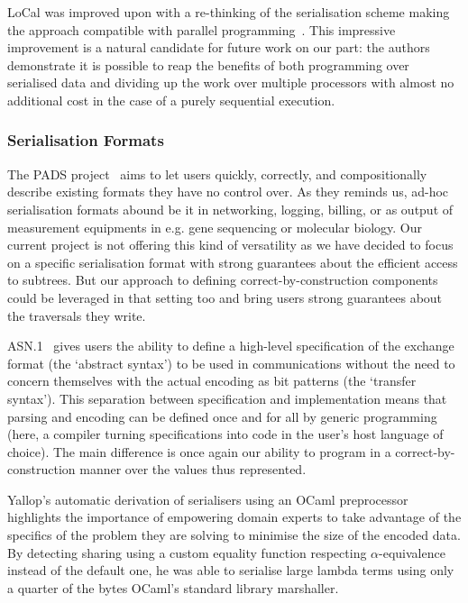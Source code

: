 LoCal was improved upon with a re-thinking of the serialisation scheme
making the approach compatible with parallel
programming~\citep{DBLP:journals/pacmpl/KoparkarRVKN21}.
This impressive improvement is a natural candidate for future work on our
part: the authors demonstrate it is possible to reap the benefits of
both programming over serialised data
and dividing up the work over multiple processors
with almost no additional cost in the case of a purely sequential execution.

\subsubsection{Serialisation Formats}

The PADS project~\citep{DBLP:conf/popl/MandelbaumFWFG07} aims to let users
quickly, correctly, and compositionally describe existing formats they
have no control over.
%
As they reminds us, ad-hoc serialisation formats abound be it in
networking, logging, billing, or as output of measurement equipments
in e.g. gene sequencing or molecular biology.
%
Our current project is not offering this kind of versatility as we have
decided to focus on a specific serialisation format with strong
guarantees about the efficient access to subtrees.
%
But our approach to defining correct-by-construction components could
be leveraged in that setting too and bring users strong guarantees about
the traversals they write.

ASN.1~\citep{MANUAL:book/larmouth1999} gives users the ability to define
a high-level specification of the exchange format (the `abstract syntax')
to be used in communications without the need to concern themselves with
the actual encoding as bit patterns (the `transfer syntax').
%
This separation between specification and implementation means that parsing
and encoding can be defined once and for all by generic programming
(here, a compiler turning specifications into code in the user's host
language of choice).
%
The main difference is once again our ability to program in a
correct-by-construction manner over the values thus represented.


Yallop's automatic derivation of serialisers using an OCaml
preprocessor~\citep{DBLP:conf/ml/Yallop07} highlights the importance
of empowering domain experts to take advantage of the specifics of
the problem they are solving to minimise the size of the encoded data.
%
By detecting sharing using a custom equality function respecting
$\alpha$-equivalence instead of the default one, he was able to
serialise large lambda terms using only
a quarter of the bytes OCaml's standard library marshaller.

